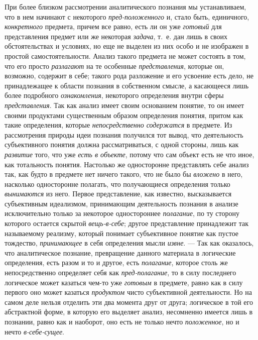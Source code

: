 \documentclass[twoside]{article}
\begin{document}
{При более близком рассмотрении аналитического познания мы
устанавливаем, что в нем начинают с некоторого
{\em пред-положенного}
и, стало быть, единичного,
{\em конкретного}
предмета, причем все равно, есть ли он уже
{\em готовый} для
представления предмет или же некоторая
{\em задача}, т.~е. дан
лишь в своих обстоятельствах и условиях, но еще не выделен из них особо и
не изображен в простой самостоятельности. Анализ такого предмета не может
состоять в том, что его просто
{\em разлагают} на те
особенные {\em представления},
которые он, возможно, содержит в себе; такого рода разложение
и его усвоение есть дело, не принадлежащее к области познания в собственном
смысле, а касающееся лишь более подробного
{\em ознакомления},
некоторого определения внутри сферы
{\em представления}. Так
как анализ имеет своим основанием понятие, то он имеет своими продуктами
существенным образом определения понятия, притом как такие определения,
которые {\em непосредственно
содержатся} в предмете. Из рассмотрения природы идеи
познания получился тот вывод, что деятельность субъективного понятия должна
рассматриваться, с одной стороны, лишь как
{\em развитие} того, что
уже {\em есть в объекте},
потому что сам объект есть не что иное, как тотальность
понятия. Настолько же односторонне представлять себе анализ так, как будто
в предмете нет ничего такого, что не было бы
{\em вложено} в него,
насколько односторонне полагать, что получающиеся определения
только {\em вынимаются}
из него. Первое представление, как известно, высказывается
субъективным идеализмом, принимающим деятельность познания в анализе
исключительно только за некоторое одностороннее
{\em полагание}, по ту
сторону которого остается скрытой
{\em вещь-в-себе}; другое
представление принадлежит так называемому реализму, который понимает
субъективное понятие как пустое тождество,
{\em принимающее} в себя
определения мысли {\em извне}. —
Так как оказалось, что аналитическое познание, превращение
данного материала в логические определения, есть разом и то и другое, есть
{\em полагание}, которое
столь же непосредственно определяет себя как
{\em пред-полагание}, то
в силу последнего логическое может казаться чем-то уже
{\em готовым} в предмете,
равно как в силу первого оно может казаться
{\em продуктом} чисто
субъективной деятельности. Но на самом деле нельзя отделить эти два момента
друг от друга; логическое в той его абстрактной форме, в которую его
выделяет анализ, несомненно имеется лишь в познании, равно как и наоборот,
оно есть не только нечто
{\em положенное}, но и
нечто {\em в-себе-сущее}.

}
\end{document}
